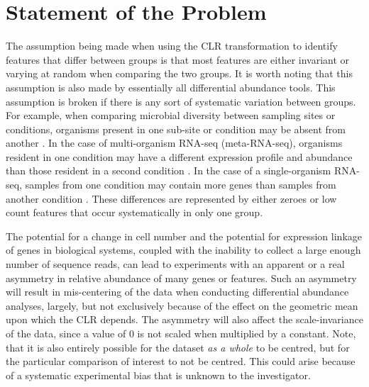 \documentclass[10pt]{article}
\begin{document}
\section{Statement of the Problem}
\vskip-0.25cm

The assumption being made when using the CLR transformation to identify features that differ between groups is that most features are either invariant or varying at random when comparing the two groups. It is worth noting that this assumption is also made by essentially all differential abundance tools. This assumption is broken if there is any sort of systematic variation between groups. For example, when comparing microbial diversity between sampling sites or conditions, organisms present in one sub-site or condition may be absent from another . In the case of multi-organism RNA-seq (meta-RNA-seq), organisms resident in one condition may have a different expression profile and abundance than those resident in a second condition . In the case of a single-organism RNA-seq, samples from one condition may contain more genes than samples from another condition . These differences are represented by either zeroes or low count features that occur systematically in only one group. 

The potential for a change in cell number and the potential for expression linkage of genes in biological systems, coupled with the inability to collect a large enough number of sequence reads, can lead to experiments with an apparent or a real asymmetry in relative abundance of many genes or features. Such an asymmetry will result in mis-centering of the data when conducting differential abundance analyses, largely, but not exclusively because of the effect on the geometric mean upon which the CLR depends. The asymmetry will also affect the scale-invariance of the data, since a value of 0 is not scaled when multiplied by a constant. Note, that it is also entirely possible for the dataset \emph{as a whole} to be centred, but for the particular comparison of interest to not be centred. This could arise because of a systematic experimental bias that is unknown to the investigator. 
\end{document}
